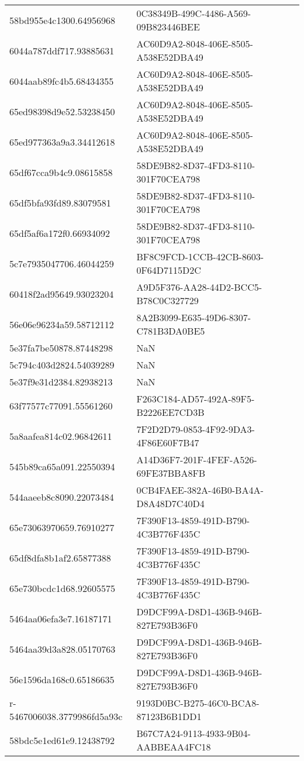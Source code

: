 \begin{tabular}{ll}
58bd955e4c1300.64956968 & 0C38349B-499C-4486-A569-09B823446BEE \\
6044a787ddf717.93885631 & AC60D9A2-8048-406E-8505-A538E52DBA49 \\
6044aab89fc4b5.68434355 & AC60D9A2-8048-406E-8505-A538E52DBA49 \\
65ed98398d9e52.53238450 & AC60D9A2-8048-406E-8505-A538E52DBA49 \\
65ed977363a9a3.34412618 & AC60D9A2-8048-406E-8505-A538E52DBA49 \\
65df67cca9b4c9.08615858 & 58DE9B82-8D37-4FD3-8110-301F70CEA798 \\
65df5bfa93fd89.83079581 & 58DE9B82-8D37-4FD3-8110-301F70CEA798 \\
65df5af6a172f0.66934092 & 58DE9B82-8D37-4FD3-8110-301F70CEA798 \\
5c7e7935047706.46044259 & BF8C9FCD-1CCB-42CB-8603-0F64D7115D2C \\
60418f2ad95649.93023204 & A9D5F376-AA28-44D2-BCC5-B78C0C327729 \\
56e06e96234a59.58712112 & 8A2B3099-E635-49D6-8307-C781B3DA0BE5 \\
5e37fa7be50878.87448298 & NaN \\
5c794c403d2824.54039289 & NaN \\
5e37f9e31d2384.82938213 & NaN \\
63f77577c77091.55561260 & F263C184-AD57-492A-89F5-B2226EE7CD3B \\
5a8aafea814c02.96842611 & 7F2D2D79-0853-4F92-9DA3-4F86E60F7B47 \\
545b89ca65a091.22550394 & A14D36F7-201F-4FEF-A526-69FE37BBA8FB \\
544aaeeb8c8090.22073484 & 0CB4FAEE-382A-46B0-BA4A-D8A48D7C40D4 \\
65e73063970659.76910277 & 7F390F13-4859-491D-B790-4C3B776F435C \\
65df8dfa8b1af2.65877388 & 7F390F13-4859-491D-B790-4C3B776F435C \\
65e730bcdc1d68.92605575 & 7F390F13-4859-491D-B790-4C3B776F435C \\
5464aa06efa3e7.16187171 & D9DCF99A-D8D1-436B-946B-827E793B36F0 \\
5464aa39d3a828.05170763 & D9DCF99A-D8D1-436B-946B-827E793B36F0 \\
56e1596da168c0.65186635 & D9DCF99A-D8D1-436B-946B-827E793B36F0 \\
r-5467006038.3779986fd5a93c & 9193D0BC-B275-46C0-BCA8-87123B6B1DD1 \\
58bdc5e1ed61e9.12438792 & B67C7A24-9113-4933-9B04-AABBEAA4FC18 \\

\end{tabular}
